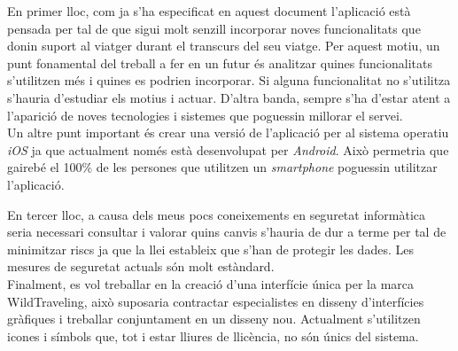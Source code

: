 En primer lloc, com ja s'ha especificat en aquest document l'aplicació està pensada per tal de que sigui molt senzill incorporar noves funcionalitats que donin suport al viatger durant el transcurs del seu viatge. Per aquest motiu, un punt fonamental del treball a fer en un futur és analitzar quines funcionalitats s'utilitzen més i quines es podrien incorporar. Si alguna funcionalitat no s'utilitza s'hauria d'estudiar els motius i actuar. D'altra banda, sempre s'ha d'estar atent a l'aparició de noves tecnologies i sistemes que poguessin millorar el servei.\\

Un altre punt important és crear una versió de l'aplicació per al sistema operatiu \textit{iOS} ja que actualment només està desenvolupat per \textit{Android}. Això permetria que gairebé el 100\% de les persones que utilitzen un \textit{smartphone} poguessin utilitzar l'aplicació.\\

\clearpage

En tercer lloc, a causa dels meus pocs coneixements en seguretat informàtica seria necessari consultar i valorar quins canvis s'hauria de dur a terme per tal de minimitzar riscs ja que la llei estableix que s'han de protegir les dades. Les mesures de seguretat actuals són molt estàndard.\\

Finalment, es vol treballar en la creació d'una interfície única per la marca WildTraveling, això suposaria contractar especialistes en disseny d'interfícies gràfiques i treballar conjuntament en un disseny nou. Actualment s'utilitzen icones i símbols que, tot i estar lliures de llicència, no són únics del sistema.


